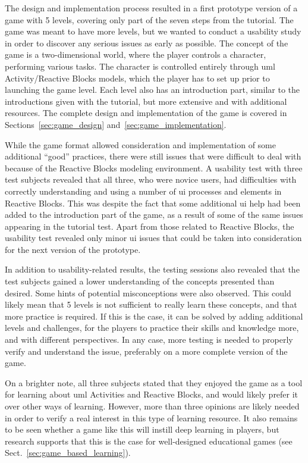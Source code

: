 \noindent
The design and implementation process resulted in a first prototype version of a game with 5 levels, covering only part of the seven steps from the tutorial. The game was meant to have more levels, but we wanted to conduct a usability study in order to discover any serious issues as early as possible. The concept of the game is a two-dimensional world, where the player controls a character, performing various tasks. The character is controlled entirely through \gls{uml} Activity/Reactive Blocks models, which the player has to set up prior to launching the game level. Each level also has an introduction part, similar to the introductions given with the tutorial, but more extensive and with additional resources. The complete design and implementation of the game is covered in Sections~\ref{sec:game_design} and~\ref{sec:game_implementation}.

\noindent
While the game format allowed consideration and implementation of some additional ``good'' practices, there were still issues that were difficult to deal with because of the Reactive Blocks modeling environment. A usability test with three test subjects revealed that all three, who were novice users, had difficulties with correctly understanding and using a number of \gls{ui} processes and elements in Reactive Blocks. This was despite the fact that some additional \gls{ui} help had been added to the introduction part of the game, as a result of some of the same issues appearing in the tutorial test. Apart from those related to Reactive Blocks, the usability test revealed only minor \gls{ui} issues that could be taken into consideration for the next version of the prototype.

\noindent
In addition to usability-related results, the testing sessions also revealed that the test subjects gained a lower understanding of the concepts presented than desired. Some hints of potential misconceptions were also observed. This could likely mean that 5 levels is not sufficient to really learn these concepts, and that more practice is required. If this is the case, it can be solved by adding additional levels and challenges, for the players to practice their skills and knowledge more, and with different perspectives. In any case, more testing is needed to properly verify and understand the issue, preferably on a more complete version of the game.

\noindent
On a brighter note, all three subjects stated that they enjoyed the game as a tool for learning about \gls{uml} Activities and Reactive Blocks, and would likely prefer it over other ways of learning. However, more than three opinions are likely needed in order to verify a real interest in this type of learning resource. It also remains to be seen whether a game like this will instill deep learning in players, but research supports that this is the case for well-designed educational games (see Sect.~\ref{sec:game_based_learning}).

